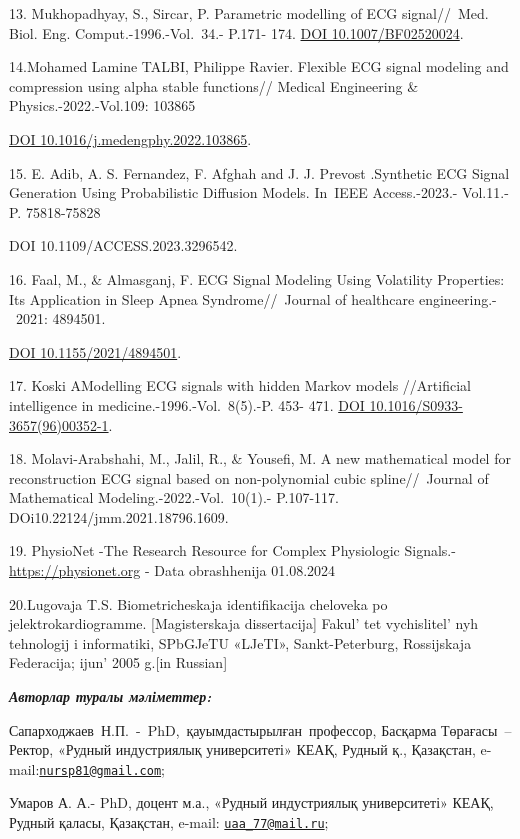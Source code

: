 {13. Mukhopadhyay, S., Sircar, P. Parametric modelling of ECG
signal//~Med. Biol. Eng. Comput.-1996.-Vol.~34.- P.171- 174.
\href{https://doi.org/10.1007/BF02520024}{DOI 10.1007/BF02520024}.

14.Mohamed Lamine TALBI, Philippe Ravier. Flexible ECG signal modeling
and compression using alpha stable functions// Medical Engineering \&
Physics.-2022.-Vol.109: 103865

\href{https://doi.org/10.1016/j.medengphy.2022.103865}{DOI
10.1016/j.medengphy.2022.103865}.

15. E. Adib, A. S. Fernandez, F. Afghah and J. J. Prevost .Synthetic ECG
Signal Generation Using Probabilistic Diffusion Models. In~IEEE
Access.-2023.- Vol.11.- P. 75818-75828

DOI 10.1109/ACCESS.2023.3296542.

16. Faal, M., \& Almasganj, F. ECG Signal Modeling Using Volatility
Properties: Its Application in Sleep Apnea Syndrome//~Journal of
healthcare engineering.-~2021: 4894501.

\href{https://doi.org/10.1155/2021/4894501}{DOI 10.1155/2021/4894501}.

17. Koski AModelling ECG signals with hidden Markov models //Artificial
intelligence in medicine.-1996.-Vol.~8(5).-P. 453- 471.
\href{https://doi.org/10.1016/S0933-3657(96)00352-1}{DOI
10.1016/S0933-3657(96)00352-1}.

18. Molavi-Arabshahi, M., Jalil, R., \& Yousefi, M. A new mathematical
model for reconstruction ECG signal based on non-polynomial cubic
spline//~Journal of Mathematical Modeling.-2022.-Vol.~10(1).- P.107-117.
DOi10.22124/jmm.2021.18796.1609.

19. PhysioNet -The Research Resource for Complex Physiologic Signals.-
\url{https://physionet.org} - Data obrashhenija 01.08.2024

20.Lugovaja T.S. Biometricheskaja identifikacija cheloveka po
jelektrokardiogramme. {[}Magisterskaja dissertacija{]}
Fakul' tet vychislitel' nyh tehnologij i
informatiki, SPbGJeTU «LJeTI», Sankt-Peterburg, Rossijskaja Federacija;
ijun'{} 2005 g.{[}in Russian{]}

\emph{{\bfseries Авторлар туралы мәліметтер:}}

Сапарходжаев~Н.П.~-~PhD,~қауымдастырылған~профессор, Басқарма
Төрағасы~-- Ректор, «Рудный индустриялық университеті» КЕАҚ, Рудный қ.,
Қазақстан,
e-mail:\href{mailto:nursp81@gmail.com}{\nolinkurl{nursp81@gmail.com}};

Умаров А. А.- PhD, доцент м.а., «Рудный индустриялық университеті» КЕАҚ,
Рудный қаласы, Қазақстан, e-mail:
\href{mailto:uaa_77@mail.ru}{\nolinkurl{uaa\_77@mail.ru}};

}
